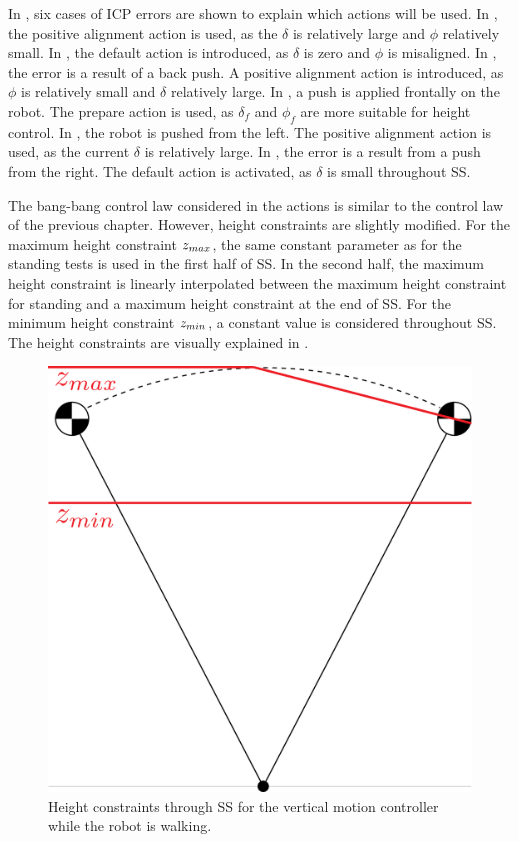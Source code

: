 In , six cases of \ac{ICP} errors are shown to explain which actions will be used. In , the positive alignment action is used, as the $\delta$ is relatively large and $\phi$ relatively small. In , the default action is introduced, as $\delta$ is zero and $\phi$ is misaligned. In , the error is a result of a back push. A positive alignment action is introduced, as $\phi$ is relatively small and $\delta$ relatively large. In , a push is applied frontally on the robot. The prepare action is used, as $\delta_f$ and $\phi_f$ are more suitable for height control. In , the robot is pushed from the left. The positive alignment action is used, as the current $\delta$ is relatively large. In , the error is a result from a push from the right. The default action is activated, as $\delta$ is small throughout \ac{SS}.

The bang-bang control law considered in the actions is similar to the control law of the previous chapter. However, height constraints are slightly modified. For the maximum height constraint $z_{max}$, the same constant parameter as for the standing tests is used in the first half of \ac{SS}. In the second half, the maximum height constraint is linearly interpolated between the maximum height constraint for standing and a maximum height constraint at the end of \ac{SS}.  For the minimum height constraint $z_{min}$, a constant value is considered throughout \ac{SS}. The height constraints are visually explained in .
\begin{figure}
\centering
  \includegraphics[width=.4\linewidth]{STYLESTUFF/heightconstraints.png}
   \caption{Height constraints through \acf{SS} for the vertical motion controller while the robot is walking.}
    \label{fig:heightconstraints}
\end{figure} 
